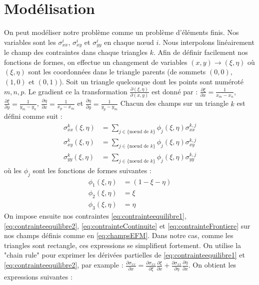 \newpage
\section{Modélisation}
On peut modéliser notre problème comme un problème d'éléments finis. Nos variables sont les $\sigma_{xx}^i$, $\sigma_{xy}^i$ et $\sigma_{yy}^i$ en chaque nœud $i$. Nous interpolons linéairement le champ des contraintes dans chaque triangles $k$.
Afin de définir facilement nos fonctions de formes, on effectue un changement de variables $(x,y)\rightarrow (\xi,\eta)$ où $(\xi, \eta)$ sont les coordonnées dans le triangle parents (de sommets $(0,0)$, $(1,0)$ et $(0,1)$). 
Soit un triangle quelconque dont les points sont numéroté $m,n,p$. 
Le gradient ce la transformation $\frac{\partial (\xi,\eta)}{\partial (x,y)}$ est donné par  : $\frac{\partial \xi}{\partial x} = \frac{1}{x_m - x_n}$, $\frac{\partial \xi}{\partial y} = \frac{1}{y_m - y_n}$, $\frac{\partial \eta}{\partial x} = \frac{1}{x_p - x_m}$ et $\frac{\partial \eta}{\partial y} = \frac{1}{y_p - y_m}$
Chacun des champs sur un triangle $k$ est défini comme suit : 
\begin{equation} \label{eq:champsEFM}
\begin{aligned}
\sigma_{xx}^k (\xi,\eta) &= \sum_{j \in \{\text{noeud de $k$}\}} \phi_j (\xi,\eta) \sigma_{xx}^{k,j}\\
\sigma_{xy}^k (\xi,\eta) &= \sum_{j \in \{\text{noeud de $k$}\}} \phi_j (\xi,\eta) \sigma_{xy}^{k,j}\\
\sigma_{yy}^k (\xi,\eta) &= \sum_{j \in \{\text{noeud de $k$}\}} \phi_j (\xi,\eta) \sigma_{yy}^{k,j}
\end{aligned}
\end{equation}
où les $\phi_j$ sont les fonctions de formes suivantes : 
\begin{equation}
\begin{aligned}
\phi_1 (\xi,\eta) &= (1- \xi - \eta)\\
\phi_2 (\xi,\eta) &= \xi\\
\phi_3 (\xi,\eta) &= \eta
\end{aligned}
\end{equation}
On impose ensuite nos contraintes \eqref{eq:contrainteequilibre1}, \eqref{eq:contrainteequilibre2}, \eqref{eq:contrainteContinuite} et \eqref{eq:contrainteFrontiere} sur nos champs définis comme en \eqref{eq:champsEFM}. 
Dans notre cas, comme les triangles sont rectangle, ces expressions se simplifient fortement. On utilise la "chain rule" pour exprimer les dérivées partielles de \eqref{eq:contrainteequilibre1} et \eqref{eq:contrainteequilibre2}, par example : $\frac{\partial \sigma_{xx}}{\partial x} = \frac{\partial \sigma_{xx}}{\partial \xi} \frac{\partial \xi}{\partial x} + \frac{\partial \sigma_{xx}}{\partial \eta} \frac{\partial \eta}{\partial x}$. On obtient les expressions suivantes : 
